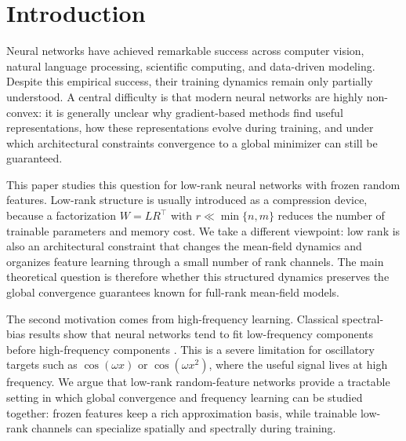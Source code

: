 \documentclass[nohyperref]{article}
\theoremstyle{plain}
\theoremstyle{definition}
\theoremstyle{remark}
\begin{document}
\section{Introduction}
\label{sec:intro}

Neural networks have achieved remarkable success across computer vision, natural language processing, scientific computing, and data-driven modeling. Despite this empirical success, their training dynamics remain only partially understood. A central difficulty is that modern neural networks are highly non-convex: it is generally unclear why gradient-based methods find useful representations, how these representations evolve during training, and under which architectural constraints convergence to a global minimizer can still be guaranteed.

This paper studies this question for low-rank neural networks with frozen random features. Low-rank structure is usually introduced as a compression device, because a factorization $W=LR^{\top}$ with $r\ll \min\{n,m\}$ reduces the number of trainable parameters and memory cost. We take a different viewpoint: low rank is also an architectural constraint that changes the mean-field dynamics and organizes feature learning through a small number of rank channels. The main theoretical question is therefore whether this structured dynamics preserves the global convergence guarantees known for full-rank mean-field models.

The second motivation comes from high-frequency learning. Classical spectral-bias results show that neural networks tend to fit low-frequency components before high-frequency components \cite{rahaman2019spectral}. This is a severe limitation for oscillatory targets such as $\cos(\omega x)$ or $\cos(\omega x^2)$, where the useful signal lives at high frequency. We argue that low-rank random-feature networks provide a tractable setting in which global convergence and frequency learning can be studied together: frozen features keep a rich approximation basis, while trainable low-rank channels can specialize spatially and spectrally during training.
\end{document}
